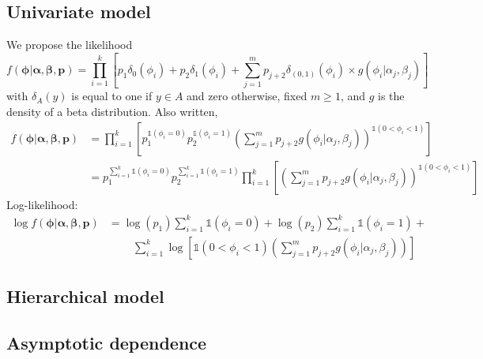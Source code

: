 \documentclass[12pt]{article}
\newcommand{\m}[1]{\mathbf{\bm{#1}}}
\newcommand{\ind}{\mathds{1}}
\begin{document}
\subsection*{Univariate model}

We propose the likelihood
\[ f(\m{\phi}|\m{\alpha},\m{\beta},\m{p}) = \prod_{i=1}^k\left[p_1 \delta_0(\phi_i) + p_2 \delta_1(\phi_i) + \sum_{j=1}^m p_{j+2} \delta_{(0,1)}(\phi_i)\times g(\phi_i|\alpha_j, \beta_j) \right] \]
with $\delta_A(y)$ is equal to one if $y\in A$ and zero otherwise, fixed $m\geq 1$, and $g$ is the density of a beta distribution. Also written,
\begin{align*}
f(\m{\phi}|\m{\alpha},\m{\beta},\m{p}) &= \prod_{i=1}^k\left[p_1^{\ind(\phi_i=0)}p_2^{\ind(\phi_i=1)}\left(\sum_{j=1}^m p_{j+2}g(\phi_i|\alpha_j, \beta_j)\right)^{\ind(0<\phi_i<1)} \right] \\
 &= p_1^{\sum_{i=1}^k\ind(\phi_i=0)}p_2^{\sum_{i=1}^k\ind(\phi_i=1)}\prod_{i=1}^k\left[\left(\sum_{j=1}^m p_{j+2}g(\phi_i|\alpha_j, \beta_j)\right)^{\ind(0<\phi_i<1)} \right]
\end{align*}
Log-likelihood:
\begin{align*}
\log f(\m{\phi}|\m{\alpha},\m{\beta},\m{p}) &= \log(p_1)\sum_{i=1}^k\ind(\phi_i=0)+\log(p_2)\sum_{i=1}^k\ind(\phi_i=1)+ \\
 & ~~~~~ ~~~~~ \sum_{i=1}^k\log\left[\ind(0<\phi_i<1)\left(\sum_{j=1}^m p_{j+2}g(\phi_i|\alpha_j, \beta_j)\right) \right]
\end{align*}

\subsection*{Hierarchical model}

\subsection*{Asymptotic dependence}
\end{document}
